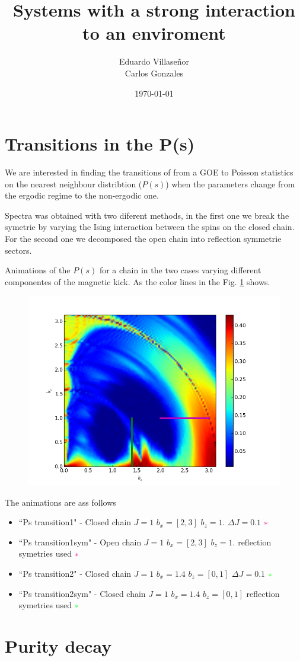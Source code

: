 \documentclass[floatfix]{article}
\title{Systems with a strong interaction to an enviroment}
\author{Eduardo Villase\~nor \\ Carlos Gonzales}
\date{\today}
\newcommand*{\gd}{
\textcolor{green}{\ast}}
\newcommand*{\md}{
\textcolor{magenta}{\ast}}
\newcommand*{\ud}{
\underline{\space\space}}
\begin{document}
\maketitle



\section{Transitions in the P(s)}

We are interested in finding the transitions of from a GOE to Poisson statistics on the
nearest neighbour distribtion ($P(s)$) when the parameters change from the ergodic regime to the non-ergodic 
one.

Spectra was obtained with two diferent methods, in the first one we break the symetrie by varying the Ising interaction between the
spins on the closed chain. For the second one we decomposed the open chain into reflection symmetrie sectors.

Animations of the $P(s)$ for a chain in the two cases varying different componentes of the magnetic kick. As
the color lines in the Fig. \ref{anim_gui} shows.

\begin{figure}[H]
\begin{center}
\includegraphics[width=.5\columnwidth]{anim_guide}  
\end{center}
\caption{}
\label{anim_gui}
\end{figure}

The animations are ass follows 
\begin{itemize}
\item ``Ps\ud transition1" - Closed chain $J=1$ $b_x=[2,3]$ $b_z=1.$ $\Delta J = 0.1$ $\md$
\item ``Ps\ud transition1\underline{\space\space}sym" - Open chain $J=1$ $b_x=[2,3]$ $b_z=1.$ reflection symetries used $\md$
\item ``Ps\ud transition2" - Closed chain $J=1$ $b_x=1.4$ $b_z=[0,1]$ $\Delta J = 0.1$ $\gd$
\item ``Ps\ud transition2\underline{\space\space}sym" - Closed chain $J=1$ $b_x=1.4$ $b_z=[0,1]$ reflection symetries used $\gd$
\end{itemize}


\section{Purity decay}
\end{document}
